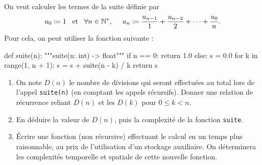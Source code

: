 \documentclass{magnolia}
\begin{document}
  On veut calculer les termes de la suite définie par
  \[
    u_0 \coloneqq 1 \quad\!\text{et}\quad\! \forall n \in {\mathbb{N}^*},\quad \ u_{n} \coloneqq \frac{u_{n-1}}{1} + \frac{u_{n-2}}{2}
    + \dots + \frac{u_0}{n}.
  \]
  Pour cela, on peut utiliser la fonction suivante :
\begin{pythoncode}
def suite(n):
    """suite(n: int) -> float"""
    if n == 0:
        return 1.0
    else:
        s = 0.0
        for k in range(1, n + 1):
            s = s + suite(n - k) / k
        return s
\end{pythoncode}
  \begin{enumerate}
    \item On note $D(n)$ le nombre de divisions qui seront
          effectuées au total lors de l'appel \verb!suite(n)!
          (en comptant les appels récursifs).
          Donner une relation de récurrence reliant $D(n)$
          et les $D(k)$ pour $0 \leq k < n$.
    \item En déduire la valeur de $D(n)$, puis la complexité
          de la fonction \verb!suite!.
    \item Écrire une fonction (non récursive) effectuant le calcul
          en un temps plus raisonnable, au prix de l'utilisation d'un
          stockage auxiliaire. On déterminera les complexités temporelle
          et spatiale de cette nouvelle fonction.
  \end{enumerate}









	
\end{document}
